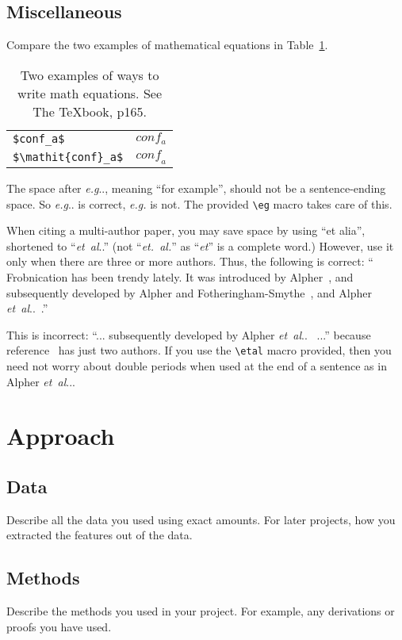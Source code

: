 \documentclass[12pt,twoside,a4paper]{article}
\makeatletter
\DeclareRobustCommand\onedot{\futurelet\@let@token\@onedot}
\def\@onedot{\ifx\@let@token.\else.\null\fi\xspace}
\def\eg{\emph{e.g}\onedot} \def\Eg{\emph{E.g}\onedot}
\def\etal{\emph{et~al}\onedot}
\makeatother
\begin{document}
\subsection{Miscellaneous}

\noindent
Compare the two examples of mathematical equations in Table~\ref{tab:math}.
\begin{table}\centering
\begin{tabular}{ll}
 \verb'$conf_a$' &  $conf_a$ \\
 \verb'$\mathit{conf}_a$' & $\mathit{conf}_a$
\end{tabular}
\caption{Two examples of ways to write math equations.  See The \TeX book, p165. \label{tab:math}}
\end{table}


The space after \eg, meaning ``for example'', should not be a
sentence-ending space. So \eg is correct, {\em e.g.} is not.  The provided
\verb'\eg' macro takes care of this.

When citing a multi-author paper, you may save space by using ``et alia'',
shortened to ``\etal'' (not ``{\em et.\ al.}'' as ``{\em et}'' is a complete word.)
However, use it only when there are three or more authors.  Thus, the
following is correct: ``
   Frobnication has been trendy lately.
   It was introduced by Alpher~\cite{Alpher02}, and subsequently developed by
   Alpher and Fotheringham-Smythe~\cite{Alpher03}, and Alpher \etal~\cite{Alpher04}.''

This is incorrect: ``... subsequently developed by Alpher \etal~\cite{Alpher03} ...''
because reference~\cite{Alpher03} has just two authors.  If you use the
\verb'\etal' macro provided, then you need not worry about double periods
when used at the end of a sentence as in Alpher \etal.

\section{Approach}
\subsection{Data}
Describe all the data you used using exact amounts.  For later projects, how you extracted the features out of the data. 
\subsection{Methods}
Describe the methods you used in your project.  For example, any derivations or proofs you have used.
\end{document}
